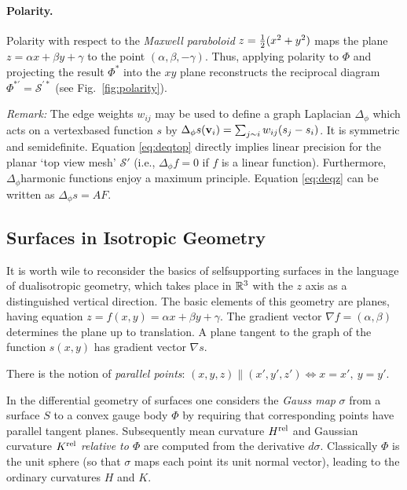 \documentclass[annual]{acmsiggraph}
\def\rel{{\mathord{\text{\rm rel}}}}
\def\SS{{\mathcal S}}
\begin{document}
\paragraph{Polarity.}

Polarity with respect to the {\em Maxwell paraboloid} $z={1\over 2}
(x^2+y^2)$ maps the plane $z=\alpha x + \beta y + \gamma$ to the point
$(\alpha,\beta,-\gamma)$. Thus, applying polarity to $\Phi$ and projecting
the result $\Phi^*$ into the $xy$ plane reconstructs the reciprocal
diagram $\Phi^{*\prime}=\SS^{\prime *}$ (see Fig.~\ref{fig:polarity}).

{\it Remark:} The edge weights $w_{ij}$ may be used to define a graph
Laplacian $\Delta_\phi$ which acts on a vertex\dash based function $s$ by
$\Delta_{\phi} s({\mathbf v}_i)=\sum_{j\sim i} w_{ij}(s_j-s_i)$. It is symmetric
and semidefinite. Equation \eqref{eq:deqtop} directly implies linear
precision for the planar `top view mesh' $\SS'$ (i.e., $\Delta_\phi f=0$
if $f$ is a linear function). Furthermore, $\Delta_\phi$\dash harmonic
functions enjoy a maximum principle. Equation \eqref{eq:deqz} can be
written as $\Delta_\phi s = AF$.

\subsection{Surfaces in Isotropic Geometry} \label{sec:smooth}

It is worth wile to reconsider the basics of self\dash supporting surfaces
in the language of dual\dash isotropic geometry, which takes place in
${\mathbb R}^3$ with the $z$ axis as a distinguished vertical direction. The basic
elements of this geometry are planes, having equation $z=f(x,y) = \alpha
x+\beta y+\gamma$. The gradient vector $\nabla f = (\alpha,\beta)$
determines the plane up to translation. A plane tangent to the graph of
the function $s(x,y)$ has gradient vector $\nabla s$.

There is the notion of {\em parallel points}:
	$
	(x,y,z) \parallel (x',y',z') \iff
	x=x',\ y=y'
	.$

In the differential geometry of surfaces one considers the {\em Gauss map}
$\sigma$ from a surface $S$ to a convex gauge body $\Phi$ by requiring
that corresponding points have parallel tangent planes.  Subsequently mean
curvature $H^\rel$ and Gaussian curvature $K^\rel$ {\em relative to
$\Phi$} are computed from the derivative $d\sigma$. Classically $\Phi$ is
the unit sphere (so that $\sigma$ maps each point its unit normal vector),
leading to the ordinary curvatures $H$ and $K$.
\end{document}
